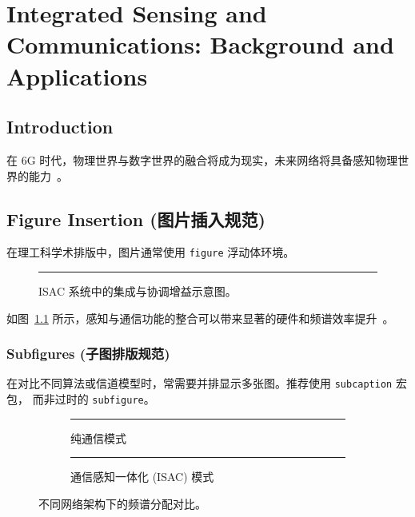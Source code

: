 \chapter{Integrated Sensing and Communications: Background and Applications}

\section{Introduction}
在 6G 时代，物理世界与数字世界的融合将成为现实，未来网络将具备感知物理世界的能力~\cite{liu2022integrated}。

\section{Figure Insertion (图片插入规范)}

在理工科学术排版中，图片通常使用 \texttt{figure} 浮动体环境。

\begin{figure}[htbp]
    \centering
    \rule{0.8\textwidth}{4cm} 
    \caption{ISAC 系统中的集成与协调增益示意图。}
    \label{fig:isac_gain}
\end{figure}

如图~\ref{fig:isac_gain} 所示，感知与通信功能的整合可以带来显著的硬件和频谱效率提升~\cite{liu2022integrated}。

\subsection{Subfigures (子图排版规范)}

在对比不同算法或信道模型时，常需要并排显示多张图。推荐使用 \texttt{subcaption} 宏包，
而非过时的 \texttt{subfigure}。

\begin{figure}[htbp]
    \centering
    \begin{subfigure}[b]{0.45\textwidth}
        \centering
        \rule{\textwidth}{3cm}
        \caption{纯通信模式}
        \label{fig:mode_a}
    \end{subfigure}
    \hfill %
    \begin{subfigure}[b]{0.45\textwidth}
        \centering
        \rule{\textwidth}{3cm}
        \caption{通信感知一体化 (ISAC) 模式}
        \label{fig:mode_b}
    \end{subfigure}
    \caption{不同网络架构下的频谱分配对比。}
    \label{fig:isac_modes}
\end{figure}

